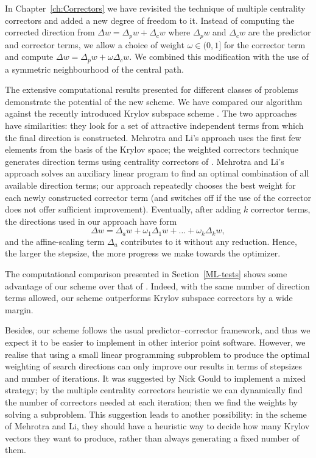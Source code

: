 
%
%
\label{ch:Conclusions}


In Chapter~\ref{ch:Correctors} we have revisited the 
technique of multiple centrality correctors \cite{Gondzio96} 
and added a new degree of freedom to it. 
Instead of computing the corrected direction from 
$\Delta w = \Delta_p w + \Delta_c w$ where 
$\Delta_p w$ and $\Delta_c w$ are the predictor and corrector terms, 
we allow a choice of weight 
$\omega \in (0,1]$ for the corrector term and compute 
$\Delta w = \Delta_p w + \omega \Delta_c w$.
We combined this modification with the use of a symmetric neighbourhood
of the central path. 

The extensive computational results presented for different 
classes of problems demonstrate the potential of the new scheme. 
We have compared our algorithm against the recently introduced 
Krylov subspace scheme \cite{MehrotraLi}.
The two approaches have similarities: they look for a set of attractive 
independent terms from which the final direction is constructed. 
Mehrotra and Li's approach uses the first few elements from the basis
of the Krylov space; the weighted correctors technique
generates direction terms using 
centrality correctors of \cite{Gondzio96}. Mehrotra and Li's approach 
solves an auxiliary linear program to find an optimal combination 
of all available direction terms; our approach repeatedly chooses 
the best weight for each newly constructed corrector term (and switches 
off if the use of the corrector does not offer sufficient improvement). 
Eventually, after adding $k$ corrector terms, 
the directions used in our approach have form
\[
  \Delta w = \Delta_a w + \omega_1\Delta_1 w + \ldots + \omega_k\Delta_k w,
\]
and the affine-scaling term $\Delta_a$ contributes to it without any
reduction. Hence, the larger the stepsize, the more progress we make
towards the optimizer.

The computational comparison presented in Section~\ref{ML-tests} 
shows some advantage
of our scheme over that of \cite{MehrotraLi}. Indeed, with the same 
number of direction terms allowed, our scheme outperforms Krylov subspace 
correctors by a wide margin.

Besides, our scheme follows the usual predictor--corrector framework,
and thus we expect it to be easier to implement in other 
interior point software.
However, we realise that using a small linear programming subproblem
to produce the optimal weighting of search directions can only improve
our results in terms of stepsizes and number of iterations.
It was suggested by Nick Gould to implement a mixed strategy;
by the multiple centrality correctors heuristic we can dynamically
find the number of correctors needed at each iteration; then we find
the weights by solving a subproblem.
This suggestion leads to another possibility: in the scheme of
Mehrotra and Li, they should have a heuristic way to decide how many
Krylov vectors they want to produce, rather than always generating
a fixed number of them.

